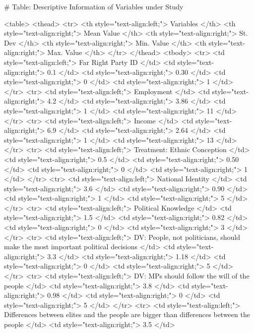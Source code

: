 # Table: Descriptive Information of Variables under Study 

<table>
 <thead>
  <tr>
   <th style="text-align:left;"> Variables </th>
   <th style="text-align:right;"> Mean Value </th>
   <th style="text-align:right;"> St. Dev </th>
   <th style="text-align:right;"> Min. Value </th>
   <th style="text-align:right;"> Max. Value </th>
  </tr>
 </thead>
<tbody>
  <tr>
   <td style="text-align:left;"> Far Right Party ID </td>
   <td style="text-align:right;"> 0.1 </td>
   <td style="text-align:right;"> 0.30 </td>
   <td style="text-align:right;"> 0 </td>
   <td style="text-align:right;"> 1 </td>
  </tr>
  <tr>
   <td style="text-align:left;"> Employment </td>
   <td style="text-align:right;"> 4.2 </td>
   <td style="text-align:right;"> 3.86 </td>
   <td style="text-align:right;"> 1 </td>
   <td style="text-align:right;"> 11 </td>
  </tr>
  <tr>
   <td style="text-align:left;"> Income </td>
   <td style="text-align:right;"> 6.9 </td>
   <td style="text-align:right;"> 2.64 </td>
   <td style="text-align:right;"> 1 </td>
   <td style="text-align:right;"> 13 </td>
  </tr>
  <tr>
   <td style="text-align:left;"> Treatment: Ethnic Conception </td>
   <td style="text-align:right;"> 0.5 </td>
   <td style="text-align:right;"> 0.50 </td>
   <td style="text-align:right;"> 0 </td>
   <td style="text-align:right;"> 1 </td>
  </tr>
  <tr>
   <td style="text-align:left;"> National Identity </td>
   <td style="text-align:right;"> 3.6 </td>
   <td style="text-align:right;"> 0.90 </td>
   <td style="text-align:right;"> 1 </td>
   <td style="text-align:right;"> 5 </td>
  </tr>
  <tr>
   <td style="text-align:left;"> Political Knowledge </td>
   <td style="text-align:right;"> 1.5 </td>
   <td style="text-align:right;"> 0.82 </td>
   <td style="text-align:right;"> 0 </td>
   <td style="text-align:right;"> 3 </td>
  </tr>
  <tr>
   <td style="text-align:left;"> DV: People, not politicians, 
 should make the most 
 important political decisions </td>
   <td style="text-align:right;"> 3.3 </td>
   <td style="text-align:right;"> 1.18 </td>
   <td style="text-align:right;"> 0 </td>
   <td style="text-align:right;"> 5 </td>
  </tr>
  <tr>
   <td style="text-align:left;"> DV: MPs should follow 
 the will of the people </td>
   <td style="text-align:right;"> 3.8 </td>
   <td style="text-align:right;"> 0.98 </td>
   <td style="text-align:right;"> 0 </td>
   <td style="text-align:right;"> 5 </td>
  </tr>
  <tr>
   <td style="text-align:left;"> Differences between elites and 
 the people are bigger than 
 differences between the people </td>
   <td style="text-align:right;"> 3.5 </td>
